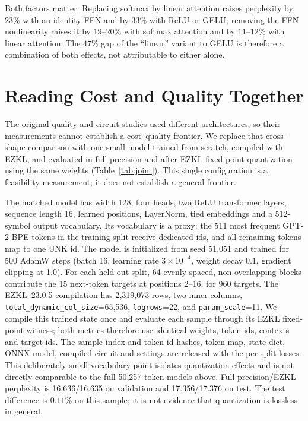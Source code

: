 \documentclass[10pt]{article}
\begin{document}
Both factors matter. Replacing softmax by linear attention raises perplexity by
$23\%$ with an identity FFN and by $33\%$ with ReLU or GELU; removing the FFN
nonlinearity raises it by $19$--$20\%$ with softmax attention and by $11$--$12\%$
with linear attention. The $47\%$ gap of the ``linear'' variant to GELU is
therefore a combination of both effects, not attributable to either alone.

\section{Reading Cost and Quality Together}
\label{sec:joint}

The original quality and circuit studies used different architectures, so their
measurements cannot establish a cost--quality frontier. We replace that
cross-shape comparison with one small model trained from scratch, compiled with
EZKL, and evaluated in full precision and after EZKL fixed-point quantization
using the same weights (Table~\ref{tab:joint}). This single configuration is a
feasibility measurement; it does not establish a general frontier.

The matched model has width 128, four heads, two ReLU transformer layers,
sequence length 16, learned positions, LayerNorm, tied embeddings and a 512-symbol
output vocabulary. Its vocabulary is a proxy: the 511 most frequent GPT-2 BPE
tokens in the training split receive dedicated ids, and all remaining tokens
map to one UNK id. The model is initialized from seed 51{,}051 and trained for
500 AdamW steps (batch 16, learning rate $3\times10^{-4}$, weight decay $0.1$,
gradient clipping at 1.0). For each held-out split, 64 evenly spaced,
non-overlapping blocks contribute the 15 next-token targets at positions 2--16,
for 960 targets. The EZKL~23.0.5 compilation has 2{,}319{,}073 rows, two inner
columns, \texttt{total\_dynamic\_col\_size}=65{,}536, \texttt{logrows}=22, and
\texttt{param\_scale}=11. We compile this trained state once and evaluate each sample
through its EZKL fixed-point witness; both metrics therefore use identical
weights, token ids, contexts and target ids. The sample-index and token-id
hashes, token map, state dict, ONNX model, compiled circuit and settings are
released with the per-split losses. This deliberately small-vocabulary point
isolates quantization effects and is not directly comparable to the full
50{,}257-token models above. Full-precision/EZKL perplexity is 16.636/16.635 on
validation and 17.356/17.376 on test. The test difference is $0.11\%$ on this
sample; it is not evidence that quantization is lossless in general.
\end{document}
